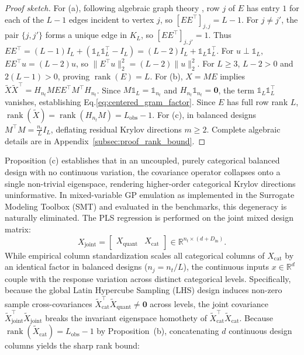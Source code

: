 \documentclass[default,sn-mathphys,Numbered]{sn-jnl}
\theoremstyle{thmstyleone}
\theoremstyle{thmstylethree}
\theoremstyle{thmstyletwo}
\newcommand{\inp}{\text{in}}
\newcommand{\rank}{\operatorname{rank}}
\newcommand{\eqnref}[1]{\eqref{#1}}
\begin{document}
\begin{proof}[Proof sketch]
For (a), following algebraic graph theory \citep{godsil2001algebraic}, row $j$ of $E$ has entry $1$ for each of the $L-1$ edges incident to vertex $j$, so $[E E^\top]_{j, j} = L - 1$. For $j \neq j'$, the pair $\{j, j'\}$ forms a unique edge in $K_L$, so $[E E^\top]_{j, j'} = 1$. Thus $E E^\top = (L - 1)I_L + (\mathds{1}_L\mathds{1}_L^\top - I_L) = (L - 2)I_L + \mathds{1}_L\mathds{1}_L^\top$. For $u \perp \mathds{1}_L$, $E E^\top u = (L - 2)u$, so $\|E^\top u\|_2^2 = (L - 2)\|u\|_2^2$. For $L \ge 3$, $L - 2 > 0$ and $2(L - 1) > 0$, proving $\rank(E) = L$. For (b), $X = M E$ implies $\tilde{X}\tilde{X}^\top = H_{n_t} M E E^\top M^\top H_{n_t}$. Since $M \mathds{1}_L = \mathds{1}_{n_t}$ and $H_{n_t} \mathds{1}_{n_t} = \bm{0}$, the term $\mathds{1}_L \mathds{1}_L^\top$ vanishes, establishing Eq.\eqnref{eq:centered_gram_factor}. Since $E$ has full row rank $L$, $\rank(\tilde{X}) = \rank(H_{n_t} M) = L_{\mathrm{obs}} - 1$. For (c), in balanced designs $M^\top M = \frac{n_t}{L} I_L$, deflating residual Krylov directions $m \ge 2$. Complete algebraic details are in Appendix~\ref{subsec:proof_rank_bound}.
\end{proof}
Proposition (c) establishes that in an uncoupled, purely categorical balanced design with no continuous variation, the covariance operator collapses onto a single non-trivial eigenspace, rendering higher-order categorical Krylov directions uninformative. In mixed-variable GP emulation as implemented in the Surrogate Modeling Toolbox (SMT) and evaluated in the benchmarks, this degeneracy is naturally eliminated. The PLS regression is performed on the joint mixed design matrix:
\begin{equation}
\label{eq:joint_pls_matrix}
X_{\mathrm{joint}} = \begin{bmatrix} X_{\mathrm{quant}} & X_{\mathrm{cat}} \end{bmatrix} \in \mathbb{R}^{n_t \times (d + D_{\inp})}.
\end{equation}
While empirical column standardization scales all categorical columns of $X_{\mathrm{cat}}$ by an identical factor in balanced designs ($n_j = n_t/L$), the continuous inputs $x \in \mathbb{R}^d$ couple with the response variation across distinct categorical levels. Specifically, because the global Latin Hypercube Sampling (LHS) design induces non-zero sample cross-covariances $\tilde{X}_{\mathrm{cat}}^\top \tilde{X}_{\mathrm{quant}} \neq \bm{0}$ across levels, the joint covariance $\tilde{X}_{\mathrm{joint}}^\top \tilde{X}_{\mathrm{joint}}$ breaks the invariant eigenspace homothety of $\tilde{X}_{\mathrm{cat}}^\top \tilde{X}_{\mathrm{cat}}$. Because $\rank(\tilde{X}_{\mathrm{cat}}) = L_{\mathrm{obs}} - 1$ by Proposition~(b), concatenating $d$ continuous design columns yields the sharp rank bound:
\end{document}
